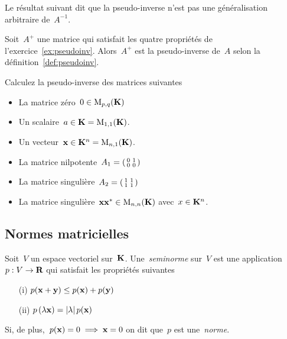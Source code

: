 Le résultat suivant dit que la pseudo-inverse n'est pas une généralisation
arbitraire de~$A^{-1}$.

\begin{theorem}[Penrose 1955]
	Soit~$A^+$ une matrice qui satisfait les quatre propriétés de
	l'exercice~\ref{ex:pseudoinv}.  Alors~$A^+$ est la pseudo-inverse de~$A$
	selon la définition~\ref{def:pseudoinv}.
\end{theorem}

\begin{exercice}
	Calculez la pseudo-inverse des matrices suivantes
	\begin{itemize}
		\item La matrice zéro~$0\in\mathrm{M}_{p,q}(\mathbf{K})$
		\item Un scalaire~$a\in\mathbf{K}=\mathrm{M}_{1,1}(\mathbf{K})$.
		\item Un vecteur~$\mathbf{x}\in\mathbf{K}^n=\mathrm{M}_{n,1}(\mathbf{K})$.
		\item La matrice
			nilpotente~$A_1=\left(\begin{smallmatrix}0&1\\0&0\end{smallmatrix}\right)$
		\item La matrice
			singulière~$A_2=\left(\begin{smallmatrix}1&1\\1&1\end{smallmatrix}\right)$
		\item La matrice singulière~$\mathbf{x}\mathbf{x}^*\in\mathrm{M}_{n,n}(\mathbf{K})$ avec~$x\in\mathbf{K}^n$.
	\end{itemize}
\end{exercice}


\clearpage
\subsection{Normes matricielles}


\begin{definition}[norme]
	Soit~$V$ un espace vectoriel sur~$\mathbf{K}$.
	Une~\emph{seminorme} sur~$V$ est une application~$p:V\to\mathbf{R}$
	qui satisfait les propriétés suivantes
	\begin{enumerate}
		\item[(i)] $p(\mathbf{x}+\mathbf{y})\le p(\mathbf{x})+p(\mathbf{y})$
		\item[(ii)] $p\left(\lambda\mathbf{x}\right)=\left|\lambda\right|p(\mathbf{x})$
	\end{enumerate}
	Si, de plus,~$p(\mathbf{x})=0\implies\mathbf{x}=0$ on dit que~$p$ est une~\emph{norme}.
\end{definition}

